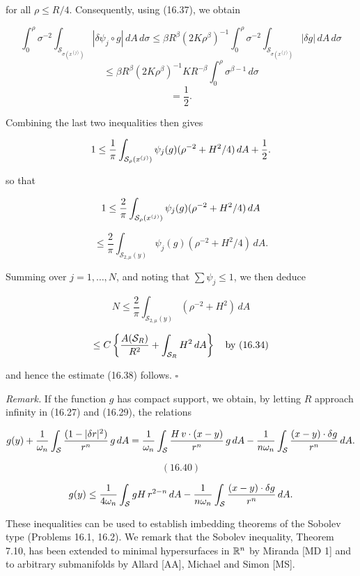 for all $\rho\le R/4$. Consequently, using (16.37), we obtain

\[
\int_0^\rho \sigma^{-2}\int_{\mathcal{S}_{\sigma(x^{(j)})}} |\delta\psi_j\circ g|\,dA\,d\sigma
\le \beta R^\beta(2K\rho^\beta)^{-1}\int_0^\rho \sigma^{-2}\int_{\mathcal{S}_{\sigma(x^{(j)})}} |\delta g|\,dA\,d\sigma
\]
\[
\le \beta R^\beta(2K\rho^\beta)^{-1}KR^{-\beta}\int_0^\rho \sigma^{\beta-1}\,d\sigma
\]
\[
=\frac{1}{2}.
\]


Combining the last two inequalities then gives

\[
1 \leq \frac{1}{\pi} \int_{\mathcal{S}_{\rho}(x^{(j)})} \psi_j(g)(\rho^{-2} + H^2/4)\,dA + \frac{1}{2}.
\]

so that

\[
1 \leq \frac{2}{\pi} \int_{\mathcal{S}_{\rho}(x^{(j)})} \psi_j(g)(\rho^{-2} + H^2/4)\,dA
\]

\[
\leq \frac{2}{\pi} \int_{\mathcal{S}_{2,\mu}(y)} \psi_j(g)(\rho^{-2} + H^2/4)\,dA.
\]

Summing over $j=1,\ldots,N$, and noting that $\sum \psi_j \leq 1$, we then deduce

\[
N \leq \frac{2}{\pi} \int_{\mathcal{S}_{2,\mu}(y)} (\rho^{-2} + H^2)\,dA
\]

\[
\leq C\left\{\frac{A(\mathcal{S}_R)}{R^2} + \int_{\mathcal{S}_R} H^2\,dA\right\} \quad \text{by (16.34)}
\]

and hence the estimate (16.38) follows.  $\square$

\emph{Remark.} If the function $g$ has compact support, we obtain, by letting $R$ approach
infinity in (16.27) and (16.29), the relations

\[
g(y) + \frac{1}{\omega_n} \int_{\mathcal{S}} \frac{(1-\lvert \delta r\rvert^2)}{r^n}\,g\,dA
= \frac{1}{\omega_n} \int_{\mathcal{S}} \frac{H\,v\cdot(x-y)}{r^n}\,g\,dA
- \frac{1}{n\omega_n} \int_{\mathcal{S}} \frac{(x-y)\cdot \delta g}{r^n}\,dA.
\]

\[
(16.40)
\]

\[
g(y) \leq \frac{1}{4\omega_n} \int_{\mathcal{S}} gH\,r^{2-n}\,dA
- \frac{1}{n\omega_n} \int_{\mathcal{S}} \frac{(x-y)\cdot \delta g}{r^n}\,dA.
\]

These inequalities can be used to establish imbedding theorems of the Sobolev
type (Problems 16.1, 16.2). We remark that the Sobolev inequality, Theorem 7.10,
has been extended to minimal hypersurfaces in $\mathbb{R}^n$ by Miranda [MD 1] and to
arbitrary submanifolds by Allard [AA], Michael and Simon [MS].


